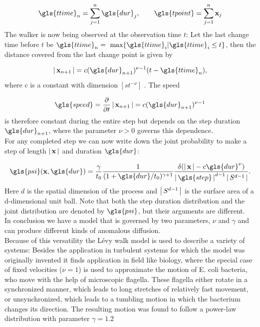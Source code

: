 \begin{align}
\gls{ttime}_n = \sum_{j=1}^n \gls{dur}_j , \qquad \gls{tpoint} = \sum_{j=1}^n \ve{x}_j
\end{align}
%
The walker is now being observed at the observation time $t$: Let the last change time before $t$ be $\gls{ttime}_n = \text{ max} \{\gls{ttime}_i | \gls{ttime}_i \leq t \}$, then the distance covered from the last change point is given by

\begin{align}
\abs{\ve{x}_{n+1}} = c (\gls{dur}_{n+1})^{\nu-1} (t-\gls{ttime}_n) ,
\end{align}
%
where c is a constant with dimension $ [ s t^{-\nu} ] $ . The speed 

\begin{align}
\gls{speed} = \pder{}{t} \abs{\ve{x}_{n+1}} = c (\gls{dur}_{n+1})^{\nu-1}
\end{align}
%
is therefore constant during the entire step but depends on the step duration $\gls{dur}_{n+1}$, where the parameter $\nu>0$ governs this dependence. \\
For any completed step we can now write down the joint probability to make a step of length $\left|\,\mathbf{ x }\,\right|$ and duration $\gls{dur}$:

\begin{align}
\gls{psi}(\ve{x}, \gls{dur} ) = \frac{\gamma}{t_0} \frac{1}{(1+\gls{dur}/t_0)^{\gamma+1}}  \frac{\delta(\abs{\ve{x}} - c \gls{dur}^{\nu}) }{\abs{\gls{step}}^{d-1} \abs{S^{d-1}}}  \label{eqn:defPsiXT}.
\end{align}
%
Here $d$ is the spatial dimension of the process and $\left|\,S^{d-1}\,\right|$ is the surface area of a d-dimensional unit ball. Note that both the step duration distribution and the joint distribution are denoted by $\gls{psi}$, but their arguments are different. \\
In conclusion we have a model that is governed by two parameters, $\nu$ and $\gamma$ and can produce different kinds of anomalous diffusion.\\

Because of this versatility the L\'evy walk model is used to describe a variety of systems: Besides the application in turbulent systems for which the model was originally invented it finds application in field like biology, where  the special case of fixed velocities ($\nu=1$) is used to approximate the motion of E. coli bacteria, who move with the help of microscopic flagella. These flagella either rotate in a synchronized manner, which leads to long stretches of relatively fast movement, or unsynchronized, which leads to a tumbling motion in which the bacterium changes its direction. The resulting motion was found to follow a power-law distribution with parameter $\gamma = 1.2$ \cite{korobkova2004}

